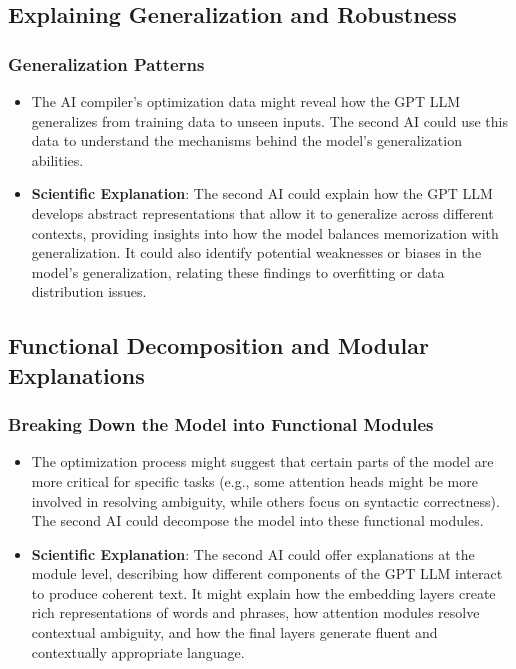 \documentclass{article}
\begin{document}
\subsection{Explaining Generalization and Robustness}
\subsubsection{Generalization Patterns}
\begin{itemize}
    \item The AI compiler’s optimization data might reveal how the GPT LLM generalizes from training data to unseen inputs. The second AI could use this data to understand the mechanisms behind the model’s generalization abilities.
    \item \textbf{Scientific Explanation}: The second AI could explain how the GPT LLM develops abstract representations that allow it to generalize across different contexts, providing insights into how the model balances memorization with generalization. It could also identify potential weaknesses or biases in the model’s generalization, relating these findings to overfitting or data distribution issues.
\end{itemize}

\subsection{Functional Decomposition and Modular Explanations}
\subsubsection{Breaking Down the Model into Functional Modules}
\begin{itemize}
    \item The optimization process might suggest that certain parts of the model are more critical for specific tasks (e.g., some attention heads might be more involved in resolving ambiguity, while others focus on syntactic correctness). The second AI could decompose the model into these functional modules.
    \item \textbf{Scientific Explanation}: The second AI could offer explanations at the module level, describing how different components of the GPT LLM interact to produce coherent text. It might explain how the embedding layers create rich representations of words and phrases, how attention modules resolve contextual ambiguity, and how the final layers generate fluent and contextually appropriate language.
\end{itemize}
\end{document}
